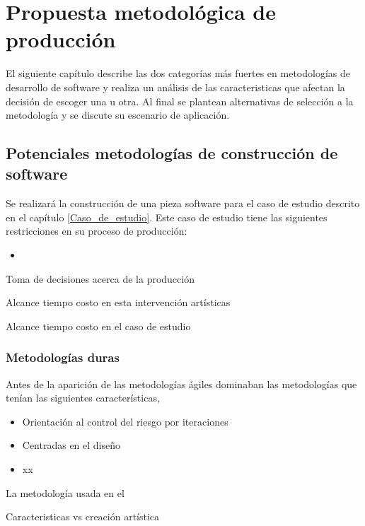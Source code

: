 
\chapter{Propuesta metodológica de producción}

El siguiente capítulo describe las dos categorías más fuertes en metodologías de desarrollo de software y realiza un análisis de las caracteristicas que afectan la decisión de escoger una u otra. Al final se plantean alternativas de selección a la metodología y se discute su escenario de aplicación.

\section{Potenciales metodologías de construcción de software}

Se realizará la construcción de una pieza software para el caso de estudio descrito en el capítulo \ref{Caso_de_estudio}. Este caso de estudio tiene las siguientes restricciones en su proceso de producción:

\begin{itemize}
  \item
\end{itemize}

Toma de decisiones acerca de la producción

Alcance tiempo costo en esta intervención artísticas

Alcance tiempo costo en el caso de estudio

\subsection{Metodologías duras}

Antes de la aparición de las metodologías ágiles dominaban las metodologías que tenían las siguientes características,

\begin{itemize}
  \item Orientación al control del riesgo por iteraciones
  \item Centradas en el diseño
  \item xx
\end{itemize}

La metodología usada en el

Caracteristicas vs creación artística

